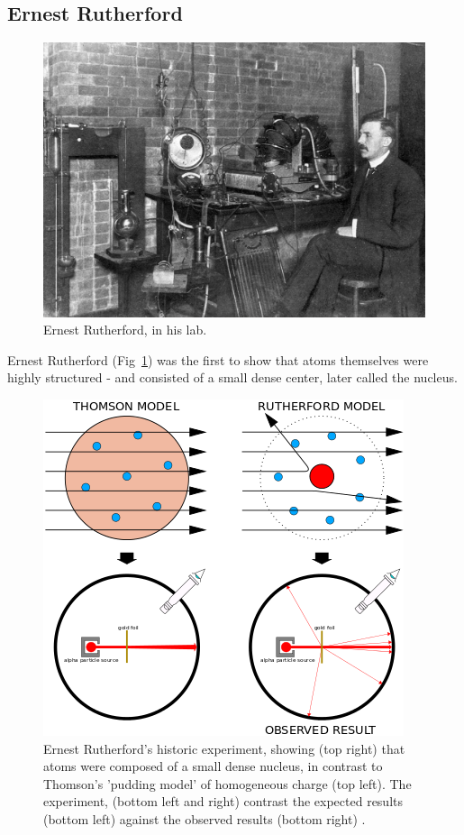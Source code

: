 \subsection{Ernest Rutherford}

\begin{figure}[ht]
	\centering
	\includegraphics[width=0.6\linewidth]{./figures/ernestrutherford.jpg}
	\caption{Ernest Rutherford, in his lab.  \cite{Eve1939}}
	\label{fig:rutherford}
\end{figure}

Ernest Rutherford (Fig~\ref{fig:rutherford}) was the first to show that atoms
themselves were highly structured - and consisted of a small dense center, later
called the nucleus.

\begin{figure}[ht]
	\centering
	\includegraphics[width=0.6\linewidth]{./figures/geiger_marsden.png}
	\caption{
		Ernest Rutherford's historic experiment, showing (top right) that atoms were
		composed of a small dense nucleus, in contrast to Thomson's 'pudding model'
		of homogeneous charge (top left). The experiment, (bottom left and right)
		contrast the expected results (bottom left) against the observed results
		(bottom right)  \cite{Kurzon2014}.
	}
	\label{fig:geigermarsden}
\end{figure}

